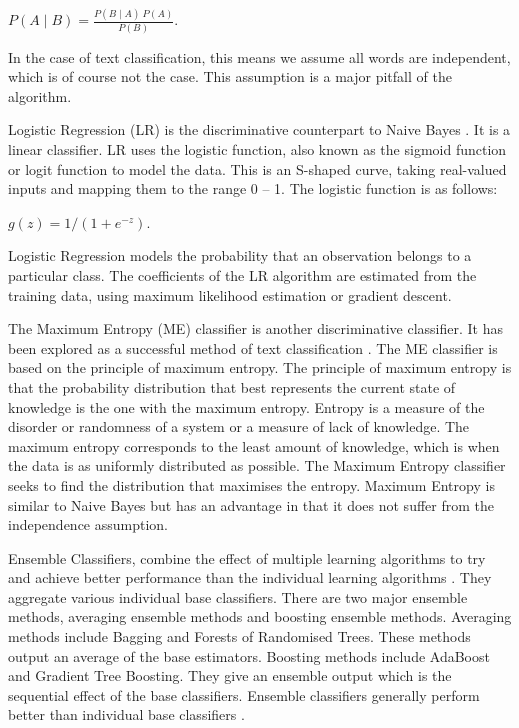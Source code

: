 \begin{center}
    \(P(A\mid B)=\frac{P(B\mid A)\:P(A)}{P(B)}\). 
\end{center}

In the case of text classification, this means we assume all words are independent, which is of course not the case. This assumption is a major pitfall of the algorithm. 

Logistic Regression (LR) is the discriminative counterpart to Naive Bayes \cite{ng2002discriminative}. It is a linear classifier. LR uses the logistic function, also known as the sigmoid function or logit function to model the data. This is an S-shaped curve, taking real-valued inputs and mapping them to the range 0 – 1. The logistic function is as follows:

\begin{center}
\(g(z)=1/(1+e^{-z})\). 
\end{center}

Logistic Regression models the probability that an observation belongs to a particular class. The coefficients of the LR algorithm are estimated from the training data, using maximum likelihood estimation or gradient descent.

The Maximum Entropy (ME) classifier is another discriminative classifier. It has been explored as a successful method of text classification \cite{MaxEnt1999}. The ME classifier is based on the principle of maximum entropy. The principle of maximum entropy is that the probability distribution that best represents the current state of knowledge is the one with the maximum entropy. Entropy is a measure of the disorder or randomness of a system or a measure of lack of knowledge. The maximum entropy corresponds to the least amount of knowledge, which is when the data is as uniformly distributed as possible. The Maximum Entropy classifier seeks to find the distribution that maximises the entropy. Maximum Entropy is similar to Naive Bayes but has an advantage in that it does not suffer from the independence assumption.

Ensemble Classifiers, combine the effect of multiple learning algorithms to try and achieve better performance than the individual learning algorithms \cite{dietterich2000ensemble}. They aggregate various individual base classifiers. There are two major ensemble methods, averaging ensemble methods and boosting ensemble methods. Averaging methods include Bagging and Forests of Randomised Trees. These methods output an average of the base estimators. Boosting methods include AdaBoost and Gradient Tree Boosting. They give an ensemble output which is the sequential effect of the base classifiers. Ensemble classifiers generally perform better than individual base classifiers \cite{Opitz1999}. 

